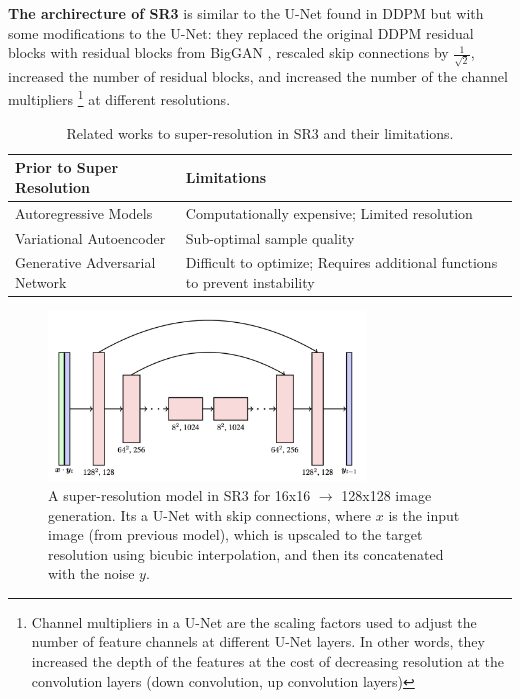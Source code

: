 \textbf{The archirecture of SR3} is similar to the U-Net found in DDPM but with some modifications to the U-Net: they replaced the original DDPM residual blocks with residual blocks from BigGAN \cite{biggan_deep}, rescaled skip connections by $\frac{1}{\sqrt{2}}$, increased the number of residual blocks, and increased the number of the channel multipliers \footnote{Channel multipliers in a U-Net are the scaling factors used to adjust the number of feature channels at different U-Net layers. In other words, they increased the depth of the features at the cost of decreasing resolution at the convolution layers (down convolution, up convolution layers)} at different resolutions.

\begin{table}[h!]
    \centering
    \begin{tabular}{|l|m{8cm}|}
        \hline
        \textbf{Prior to Super Resolution} & \textbf{Limitations} \\ \hline
        Autoregressive Models           & Computationally expensive; Limited resolution \\ \hline
        Variational Autoencoder         & Sub-optimal sample quality \\ \hline
        Generative Adversarial Network  & Difficult to optimize; Requires additional functions to prevent instability \\ \hline
    \end{tabular}
    \caption{Related works to super-resolution in SR3 and their limitations.}
\end{table}


\begin{figure}
    \centering
    \includegraphics[width=0.75\textwidth]{images/imagen/sr3_architecture.png}
    \caption{A super-resolution model in SR3 for 16x16 $\rightarrow$ 128x128 image generation. Its a U-Net with skip connections, where $x$ is the input image (from previous model), which is upscaled to the target resolution using bicubic interpolation, and then its concatenated with the noise $y$.}
    \label{fig:sr3_architecture}
\end{figure}















